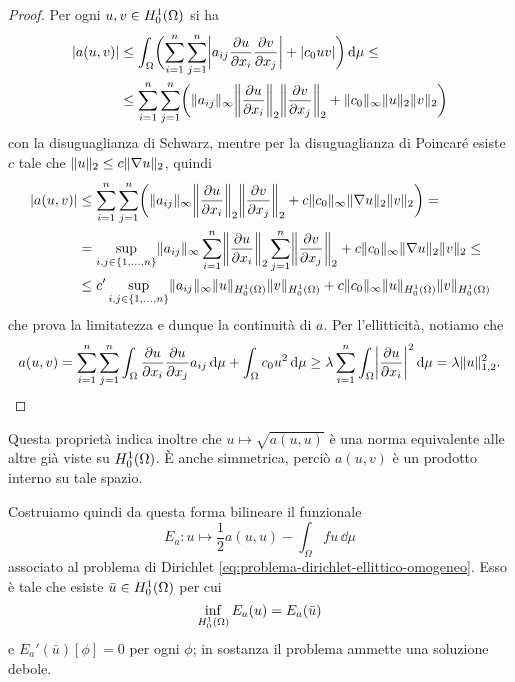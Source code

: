 \begin{proof}
    Per ogni $u,v\in\sobHc[1]{\Omega}$ si ha
    \begin{equation}
        \begin{split}
            \abs{a(u,v)}&\le
            \int_\Omega\biggl(\sum_{i=1}^n\sum_{j=1}^n\abs[\bigg]{a_{ij}\drp{u}{x_i}\drp{v}{x_j}}+\abs{c_0uv}\biggr)\,\dd\mu\le\\ &\le
            \sum_{i=1}^n\sum_{j=1}^n\biggl(\norm{a_{ij}}_\infty\norm[\bigg]{\drp{u}{x_i}}_2\norm[\bigg]{\drp{v}{x_j}}_2+\norm{c_0}_\infty\norm{u}_2\norm{v}_2\biggr)
        \end{split}
    \end{equation}
    con la disuguaglianza di Schwarz, mentre per la disuguaglianza di Poincar\'e esiste $c$ tale che $\norm{u}_2\le c\norm{\grad u}_2$, quindi
    \begin{equation}
        \begin{split}
            \abs{a(u,v)}&\le
            \sum_{i=1}^n\sum_{j=1}^n\biggl(\norm{a_{ij}}_\infty\norm[\bigg]{\drp{u}{x_i}}_2\norm[\bigg]{\drp{v}{x_j}}_2+c\norm{c_0}_\infty\norm{\grad u}_2\norm{v}_2\biggr)=\\ &=
            \sup_{i,j\in\{1,\dotsc,n\}}\norm{a_{ij}}_\infty\sum_{i=1}^n\norm[\bigg]{\drp{u}{x_i}}_2\sum_{j=1}^n\norm[\bigg]{\drp{v}{x_j}}_2+c\norm{c_0}_\infty\norm{\grad u}_2\norm{v}_2\le\\ &\le
            c'\sup_{i,j\in\{1,\dotsc,n\}}\norm{a_{ij}}_\infty\norm{u}_{\sobHc[1]{\Omega}}\norm{v}_{\sobHc[1]{\Omega}}+c\norm{c_0}_\infty\norm{u}_{\sobHc[1]{\Omega}}\norm{v}_{\sobHc[1]{\Omega}}
        \end{split}
    \end{equation}
    che prova la limitatezza e dunque la continuità di $a$.
    Per l'ellitticità, notiamo che
    \begin{equation}
        a(u,v)=
        \sum_{i=1}^n\sum_{j=1}^n\int_\Omega\drp{u}{x_i}\drp{u}{x_j}a_{ij}\,\dd\mu+\int_\Omega c_0u^2\,\dd\mu\ge
        \lambda\sum_{i=1}^n \int_\Omega\abs[\bigg]{\drp{u}{x_i}}^2\,\dd\mu=
        \lambda\norm{u}_{1,2}^2.\qedhere
    \end{equation}
\end{proof}
Questa proprietà indica inoltre che $u\mapsto\sqrt{a(u,u)}$ è una norma equivalente alle altre già viste su $\sobHc[1]{\Omega}$.
È anche simmetrica, perciò $a(u,v)$ è un prodotto interno su tale spazio.

Costruiamo quindi da questa forma bilineare il funzionale
\begin{equation}
    E_a\colon u\mapsto\frac12a(u,u)-\int_\Omega fu\,\dd\mu
    \label{eq:funzionale-energia-ellittico-dirichlet}
\end{equation}
associato al problema di Dirichlet \eqref{eq:problema-dirichlet-ellittico-omogeneo}.
Esso è tale che esiste $\bar{u}\in\sobHc[1]{\Omega}$ per cui
\begin{equation}
    \inf_{\sobHc[1]{\Omega}}E_a(u)=E_a(\bar{u})
\end{equation}
e $E_a'(\bar{u})[\phi]=0$ per ogni $\phi$; in sostanza il problema ammette una soluzione debole.

